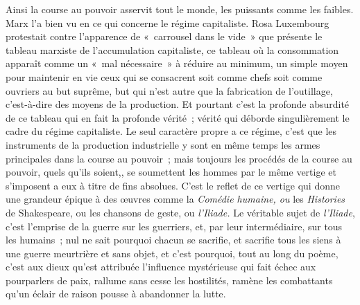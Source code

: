 \documentclass[french,twoside]{book} %
\begin{document}
Ainsi la course au pouvoir asservit tout le monde, les puissants comme les faibles. Marx l'a bien vu en ce qui concerne le régime capitaliste. Rosa Luxembourg protestait contre l'apparence de « carrousel dans le vide » que présente le tableau marxiste de l'accumulation capitaliste, ce tableau où la consommation apparaît comme un « mal nécessaire » à réduire au minimum, un simple moyen pour maintenir en vie ceux qui se consacrent soit comme chefs soit comme ouvriers au but suprême, but qui n'est autre que la fabrication de l'outillage, c'est-à-dire des moyens de la production. Et pourtant c'est la profonde absurdité de ce tableau qui en fait la profonde vérité ; vérité qui déborde singulièrement le cadre du régime capitaliste. Le seul caractère propre a ce régime, c'est que les instruments de la production industrielle y sont en même temps les armes principales dans la course au pouvoir ; mais toujours les procédés de la course au pouvoir, quels qu'ils soient,, se soumettent les hommes par le même vertige et s'imposent a eux à titre de fins absolues. C'est le reflet de ce vertige qui donne une grandeur épique à des œuvres comme la {\itshape Comédie humaine, ou} les {\itshape Histories} de Shakespeare, ou les chansons de geste, ou {\itshape l'Iliade.} Le véritable sujet de {\itshape l'Iliade}, c'est l'emprise de la guerre sur les guerriers, et, par leur intermédiaire, sur tous les humains ; nul ne sait pourquoi chacun se sacrifie, et sacrifie tous les siens à une guerre meurtrière et sans objet, et c'est pourquoi, tout au long du poème, c'est aux dieux qu'est attribuée l'influence mystérieuse qui fait échec aux pourparlers de paix, rallume sans cesse les hostilités, ramène les combattants qu'un éclair de raison pousse à abandonner la lutte.\par
\end{document}
